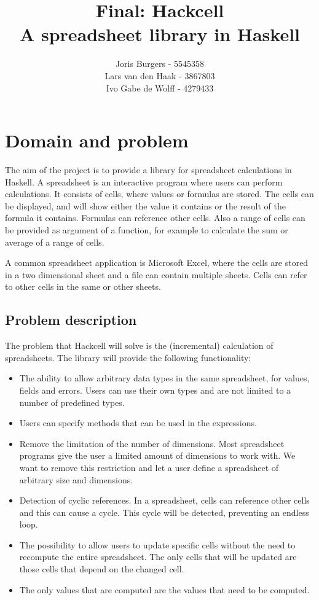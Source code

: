 \documentclass{article}
\title{
	Final: Hackcell \\
	\vskip 0.5cm
	\large{A spreadsheet library in Haskell}
}
\author{Joris Burgers - 5545358\\ Lars van den Haak - 3867803\\ Ivo Gabe de Wolff - 4279433}
\begin{document}
	\maketitle
	
	\section{Domain and problem}
	The aim of the project is to provide a library for spreadsheet calculations in Haskell. A spreadsheet is an interactive program where users can perform calculations. It consists of cells, where values or formulas are stored. The cells can be displayed, and will show either the value it contains or the result of the formula it contains. Formulas can reference other cells. Also a range of cells can be provided as argument of a function, for example to calculate the sum or average of a range of cells. 
	
	A common spreadsheet application is Microsoft Excel, where the cells are stored in a two dimensional sheet and a file can contain multiple sheets. Cells can refer to other cells in the same or other sheets.
	
	\subsection{Problem description}
	The problem that Hackcell will solve is the (incremental) calculation of spreadsheets. The library will provide the following functionality:
	\begin{itemize}
		\item The ability to allow arbitrary data types in the same spreadsheet, for values, fields and errors. Users can use their own types and are not limited to a number of predefined types.
		\item Users can specify methods that can be used in the expressions.
		\item Remove the limitation of the number of dimensions. Most spreadsheet programs give the user a limited amount of dimensions to work with. We want to remove this restriction and let a user define a spreadsheet of arbitrary size and dimensions.
		\item Detection of cyclic references. In a spreadsheet, cells can reference other cells and this can cause a cycle. This cycle will be detected, preventing an endless loop.
		\item The possibility to allow users to update specific cells without the need to recompute the entire spreadsheet. The only cells that will be updated are those cells that depend on the changed cell.
		\item The only values that are computed are the values that need to be computed.
	\end{itemize}	
	
\end{document}
